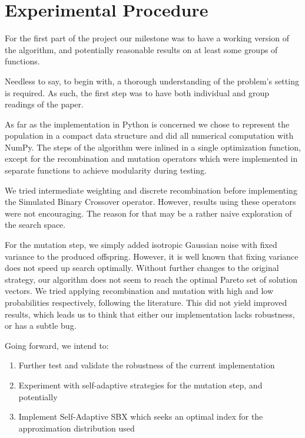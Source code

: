 \documentclass{sig-alternate}
\begin{document}
 \section{Experimental Procedure}
 For the first part of the project our milestone was to have a working version of the algorithm, and potentially reasonable results on at least some groups of functions.
 
Needless to say, to begin with, a thorough understanding of the problem's setting is required. As such, the first step was to have both individual and group readings of the paper. 

As far as the implementation in Python is concerned we chose to represent the population in a compact data structure and did all numerical computation with NumPy. The steps of the algorithm were inlined in a single optimization function, except for the recombination and mutation operators which were implemented in separate functions to achieve modularity during testing.

We tried intermediate weighting and discrete recombination before implementing the Simulated Binary Crossover operator. However, results using these operators were not encouraging. The reason for that may be a rather naive exploration of the search space.

For the mutation step, we simply added isotropic Gaussian noise with fixed variance to the produced offspring. However, it is well known that fixing variance does not speed up search optimally.
Without further changes to the original strategy, our algorithm does not seem to reach the optimal Pareto set of solution vectors. We tried applying recombination and mutation with high and low probabilities respectively, following the literature. This did not yield improved results, which leads us to think that either our implementation lacks robustness, or has a subtle bug.

Going forward, we intend to:
\begin{enumerate}
\item Further test and validate the robustness of the current implementation
\item Experiment with self-adaptive strategies for the mutation step, and potentially
\item Implement Self-Adaptive SBX which seeks an optimal index for the approximation distribution used
\end{enumerate}

\end{document}
